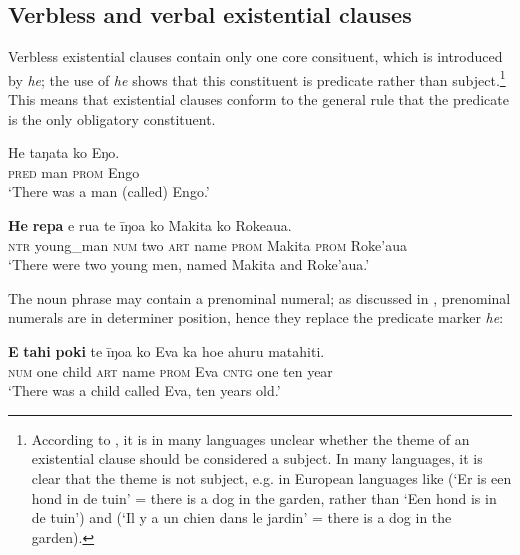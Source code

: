 \subsection{Verbless and verbal existential clauses}\label{sec:9.3.1}
Verbless existential clauses contain only one core consituent, which is introduced by \textit{he}; the use of \textit{he} shows that this constituent is predicate rather than subject.\footnote{\label{fn:473}According to \citet[241]{Dryer2007Clause}, it is in many languages unclear whether the theme of an existential clause should be considered a subject. In many languages, it is clear that the theme is not subject, e.g. in European languages like  (‘Er is een hond in de tuin’ = there is a dog in the garden, rather than ‘Een hond is in de tuin’) and  (‘Il y a un chien dans le jardin’ = there is a dog in the garden).} This means that existential clauses conform to the general rule that the predicate is the only obligatory constituent.

\ea\label{ex:9.59}
\gll He taŋata ko Eŋo. \\
\textsc{pred} man \textsc{prom} Engo \\

\glt 
‘There was a man (called) Engo.’ \textstyleExampleref{[Mtx-7-28.001]}
\z

\ea\label{ex:9.60}
\gll \textbf{He} \textbf{repa} e rua te {\ꞌ}īŋoa ko Makita ko Roke{\ꞌ}aua. \\
\textsc{ntr} young\_man \textsc{num} two \textsc{art} name \textsc{prom} Makita \textsc{prom} Roke’aua \\

\glt
‘There were two young men, named Makita and Roke’aua.’ \textstyleExampleref{[R243.001]} 
\z

The noun phrase may contain a prenominal numeral; as discussed in , prenominal numerals are in determiner position, hence they replace the predicate marker \textit{he}:

\ea\label{ex:9.61}
\gll \textbf{E} \textbf{tahi} \textbf{poki} te {\ꞌ}īŋoa ko Eva ka ho{\ꞌ}e {\ꞌ}ahuru matahiti. \\
\textsc{num} one child \textsc{art} name \textsc{prom} Eva \textsc{cntg} one ten year \\

\glt 
‘There was a child called Eva, ten years old.’ \textstyleExampleref{[R210.001]} 
\z

